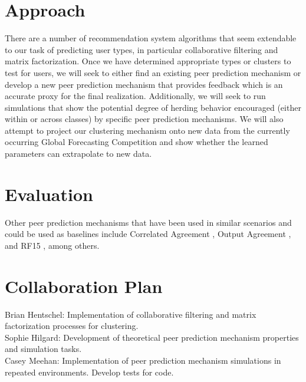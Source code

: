 \documentclass[a4paper, 11pt]{article}
\begin{document}
\section{Approach}
There are a number of recommendation system algorithms that seem extendable to our task of predicting user types, in particular collaborative filtering and matrix factorization. Once we have determined appropriate types or clusters to test for users, we will seek to either find an existing peer prediction mechanism or develop a new peer prediction mechanism that provides feedback which is an accurate proxy for the final realization. Additionally, we will seek to run simulations that show the potential degree of herding behavior encouraged (either within or across classes) by specific peer prediction mechanisms. We will also attempt to project our clustering mechanism onto new data from the currently occurring Global Forecasting Competition and show whether the learned parameters can extrapolate to new data.

\section{Evaluation}
Other peer prediction mechanisms that have been used in similar scenarios and could be used as baselines include Correlated Agreement \citep{shnayder2016informed}, Output Agreement \citep{von2004labeling}, and RF15 \citep{radanovic2015incentive}, among others.

\section{Collaboration Plan}
Brian Hentschel: Implementation of collaborative filtering and matrix factorization processes for clustering.\\
Sophie Hilgard: Development of theoretical peer prediction mechanism properties and simulation tasks.\\
Casey Meehan: Implementation of peer prediction mechanism simulations in repeated environments. Develop tests for code.
\end{document}
